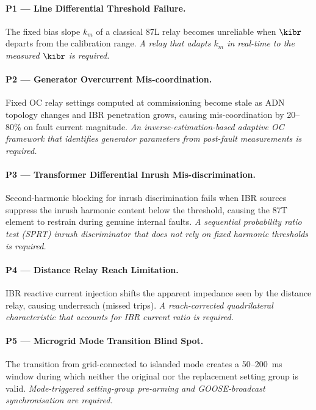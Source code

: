 \paragraph{P1 --- Line Differential Threshold Failure.}
The fixed bias slope $k_m$ of a classical 87L relay becomes unreliable when
$\kibr$ departs from the calibration range. \emph{A relay that adapts $k_m$
in real-time to the measured $\kibr$ is required.}

\paragraph{P2 --- Generator Overcurrent Mis-coordination.}
Fixed OC relay settings computed at commissioning become stale as ADN topology
changes and IBR penetration grows, causing mis-coordination by 20--80\% on
fault current magnitude. \emph{An inverse-estimation-based adaptive OC framework
that identifies generator parameters from post-fault measurements is required.}

\paragraph{P3 --- Transformer Differential Inrush Mis-discrimination.}
Second-harmonic blocking for inrush discrimination fails when IBR sources
suppress the inrush harmonic content below the threshold, causing the 87T
element to restrain during genuine internal faults.
\emph{A sequential probability ratio test (SPRT) inrush discriminator that
does not rely on fixed harmonic thresholds is required.}

\paragraph{P4 --- Distance Relay Reach Limitation.}
IBR reactive current injection shifts the apparent impedance seen by the
distance relay, causing underreach (missed trips). \emph{A reach-corrected
quadrilateral characteristic that accounts for IBR current ratio is required.}

\paragraph{P5 --- Microgrid Mode Transition Blind Spot.}
The transition from grid-connected to islanded mode creates a 50--200~ms
window during which neither the original nor the replacement setting group
is valid. \emph{Mode-triggered setting-group pre-arming and GOOSE-broadcast
synchronisation are required.}

